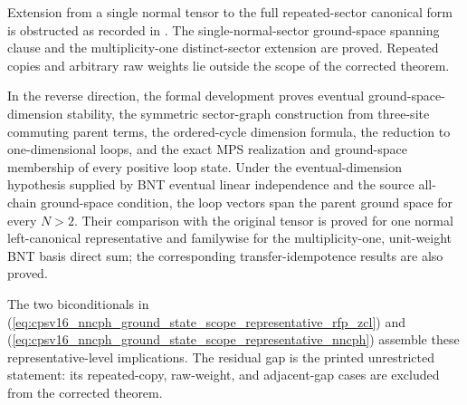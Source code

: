 \documentclass{article}
\begin{document}
Extension from a single normal tensor to the full repeated-sector canonical
form is obstructed as recorded in
. The single-normal-sector
ground-space spanning clause and the multiplicity-one distinct-sector
extension are proved. Repeated copies and arbitrary raw weights lie outside
the scope of the corrected theorem.

In the reverse direction, the formal development proves eventual
ground-space-dimension stability, the symmetric sector-graph construction from
three-site commuting parent terms, the ordered-cycle dimension formula, the
reduction to one-dimensional loops, and the exact MPS realization and
ground-space membership of every positive loop state. Under the
eventual-dimension hypothesis supplied by BNT eventual linear independence and
the source all-chain ground-space condition, the loop vectors span the parent
ground space for every $N>2$. Their comparison with the original tensor is
proved for one normal left-canonical representative and familywise for the
multiplicity-one, unit-weight BNT basis direct sum; the corresponding
transfer-idempotence results are also proved.

The two biconditionals in
(\ref{eq:cpsv16_nncph_ground_state_scope_representative_rfp_zcl}) and
(\ref{eq:cpsv16_nncph_ground_state_scope_representative_nncph}) assemble these
representative-level implications. The residual gap is the printed
unrestricted statement: its repeated-copy, raw-weight, and adjacent-gap cases
are excluded from the corrected theorem.



\end{document}
